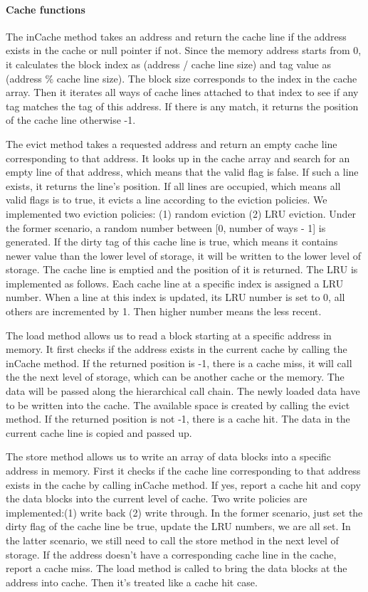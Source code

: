 \documentclass{sig-alternate}
\begin{document}
\paragraph{Cache functions}
The inCache method takes an address and return the cache line if the address exists in the cache or null pointer if not. Since the memory address starts from 0, it calculates the block index as (address / cache line size) and tag value as (address $\%$ cache line size). The block size corresponds to the index in the cache array. Then it iterates all ways of cache lines attached to that index to see if any tag matches the tag of this address. If there is any match, it returns the position of the cache line otherwise -1. 

The evict method takes a requested address and return an empty cache line corresponding to that address. It looks up in the cache array and search for an empty line of that address, which means that the valid flag is  false. If such a line exists, it returns the line's position. If all lines are occupied, which means all valid flags is to true, it evicts a line according to the eviction policies. We implemented two eviction policies: (1) random eviction (2) LRU eviction. Under the former scenario, a random number between [0, number of ways - 1] is generated. If the dirty tag of this cache line is true, which means it contains newer value than the lower level of storage, it will be written to the lower level of storage. The cache line is emptied and the position of it is returned. The LRU is implemented as follows. Each cache line at a specific index is assigned a LRU number. When a line at this index is updated, its LRU number is set to 0, all others are incremented by 1. Then higher number means the less recent. 

The load method allows us to read a block starting at a specific address in memory. It first checks if the address exists in the current cache by calling the inCache method. If the returned position is -1, there is a cache miss, it will call the the next level of storage, which can be another cache or the memory. The data will be passed along the hierarchical call chain. The newly loaded data have to be written into the cache. The available space is created by calling the evict method. If the returned position is not -1, there is a cache hit. The data in the current cache line is copied and passed up. 

The store method allows us to write an array of data blocks into a specific address in memory. First it checks if the cache line corresponding to that address exists in the cache by calling inCache method. If yes, report a cache hit and copy the data blocks into the current level of cache. Two write policies are implemented:(1) write back (2) write through. In the former scenario, just set the dirty flag of the cache line be true, update the LRU numbers, we are all set. In the latter scenario, we still need to call the store method in the next level of storage. If the address doesn't have a corresponding cache line in the cache, report a cache miss. The load method is called to bring the data blocks at the address into cache. Then it's treated like a cache hit case. 
\end{document}
